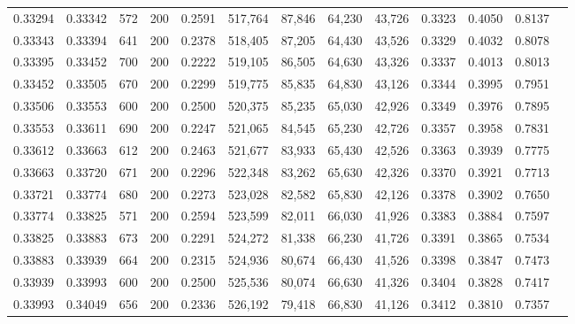 \begin{tabular}{rrrrrrrrrrrrr}
0.33294 & 0.33342 &   572 & 200 &                                     0.2591 & 517,764 &  87,846 &  64,230 &  43,726 & 0.3323 & 0.4050 & 0.8137 \\
0.33343 & 0.33394 &   641 & 200 &                                     0.2378 & 518,405 &  87,205 &  64,430 &  43,526 & 0.3329 & 0.4032 & 0.8078 \\
0.33395 & 0.33452 &   700 & 200 &                                     0.2222 & 519,105 &  86,505 &  64,630 &  43,326 & 0.3337 & 0.4013 & 0.8013 \\
0.33452 & 0.33505 &   670 & 200 &                                     0.2299 & 519,775 &  85,835 &  64,830 &  43,126 & 0.3344 & 0.3995 & 0.7951 \\
0.33506 & 0.33553 &   600 & 200 &                                     0.2500 & 520,375 &  85,235 &  65,030 &  42,926 & 0.3349 & 0.3976 & 0.7895 \\
0.33553 & 0.33611 &   690 & 200 &                                     0.2247 & 521,065 &  84,545 &  65,230 &  42,726 & 0.3357 & 0.3958 & 0.7831 \\
0.33612 & 0.33663 &   612 & 200 &                                     0.2463 & 521,677 &  83,933 &  65,430 &  42,526 & 0.3363 & 0.3939 & 0.7775 \\
0.33663 & 0.33720 &   671 & 200 &                                     0.2296 & 522,348 &  83,262 &  65,630 &  42,326 & 0.3370 & 0.3921 & 0.7713 \\
0.33721 & 0.33774 &   680 & 200 &                                     0.2273 & 523,028 &  82,582 &  65,830 &  42,126 & 0.3378 & 0.3902 & 0.7650 \\
0.33774 & 0.33825 &   571 & 200 &                                     0.2594 & 523,599 &  82,011 &  66,030 &  41,926 & 0.3383 & 0.3884 & 0.7597 \\
0.33825 & 0.33883 &   673 & 200 &                                     0.2291 & 524,272 &  81,338 &  66,230 &  41,726 & 0.3391 & 0.3865 & 0.7534 \\
0.33883 & 0.33939 &   664 & 200 &                                     0.2315 & 524,936 &  80,674 &  66,430 &  41,526 & 0.3398 & 0.3847 & 0.7473 \\
0.33939 & 0.33993 &   600 & 200 &                                     0.2500 & 525,536 &  80,074 &  66,630 &  41,326 & 0.3404 & 0.3828 & 0.7417 \\
0.33993 & 0.34049 &   656 & 200 &                                     0.2336 & 526,192 &  79,418 &  66,830 &  41,126 & 0.3412 & 0.3810 & 0.7357 \\

\end{tabular}
